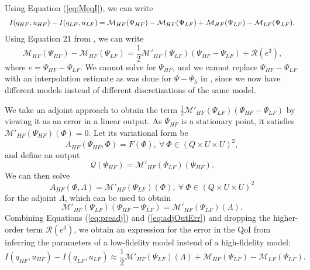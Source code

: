 Using Equation (\ref{eq:MeqI}), we can write
\begin{equation}
\begin{array}{r@{}l}
I(q_{HF},u_{HF})-I(q_{LF},u_{LF})\: &= \mathcal{M}_{HF}(\Psi_{HF})-\mathcal{M}_{HF}(\Psi_{LF})+\mathcal{M}_{HF}(\Psi_{LF})-\mathcal{M}_{LF}(\Psi_{LF})\textrm{.} 
\end{array}
\end{equation}
Using Equation 21 from \cite{BecVex05}, we can write
\begin{equation}
\mathcal{M}_{HF}(\Psi_{HF})-\mathcal{M}_{HF}(\Psi_{LF}) = \frac{1}{2}\mathcal{M}'_{HF}(\Psi_{LF})(\Psi_{HF}-\Psi_{LF})+\mathcal{R}(e^3)\textrm{,}
\label{eq:preadj}
\end{equation}
where $e=\Psi_{HF}-\Psi_{LF}$. We cannot solve for $\Psi_{HF}$, and we cannot replace $\Psi_{HF}-\Psi_{LF}$ with an interpolation estimate as was done for $\Psi-\Psi_h$ in \cite{BecVex05}, since we now have different models instead of different discretizations of the same model. 

We take an adjoint approach to obtain the term $\frac{1}{2}\mathcal{M}'_{HF}(\Psi_{LF})(\Psi_{HF}-\Psi_{LF})$ by viewing it as an error in a linear output. As $\Psi_{HF}$ is a stationary point, it satisfies $\mathcal{M}'_{HF}(\Psi_{HF})(\Phi)=0$. Let its variational form be
\begin{equation}
A_{HF}(\Psi_{HF},\Phi)=F(\Phi),\:\forall\:\Phi\in(Q\times U\times U)^2,
\end{equation}
and define an output 
\begin{equation}
\mathcal{Q}(\Psi_{HF})=\mathcal{M}'_{HF}(\Psi_{LF})(\Psi_{HF}).
\end{equation}
We can then solve
\begin{equation}
A_{HF}(\Phi,\Lambda)=\mathcal M'_{HF}(\Psi_{LF})(\Phi),\:\forall\:\Phi\in(Q\times U\times U)^2
\label{eq:superAdjEq}
\end{equation}
for the adjoint $\Lambda$, which can be used to obtain
\begin{equation}
\mathcal M'_{HF}(\Psi_{LF})(\Psi_{HF}-\Psi_{LF})=\mathcal{M}'_{HF}(\Psi_{LF})(\Lambda).
\label{eq:adjOutErr}
\end{equation}
Combining Equations (\ref{eq:preadj}) and (\ref{eq:adjOutErr}) and dropping the higher-order term $\mathcal{R}(e^3)$, we obtain an expression for the error in the QoI from inferring the parameters of a low-fidelity model instead of a high-fidelity model:
\begin{equation}
I(q_{HF},u_{HF})-I(q_{LF},u_{LF})\approx\frac{1}{2}\mathcal{M}'_{HF}(\Psi_{LF})(\Lambda)+\mathcal M_{HF}(\Psi_{LF})-\mathcal M_{LF}(\Psi_{LF}).
\label{eq:finErrExp}
\end{equation}

